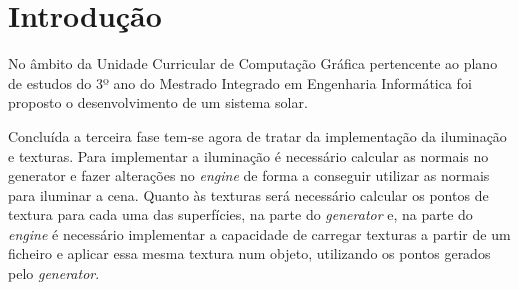 \chapter{Introdução}
\label{cap:intro}

No âmbito da Unidade Curricular de Computação Gráfica pertencente ao plano de estudos do 3º ano do Mestrado Integrado em Engenharia Informática foi proposto o desenvolvimento de um sistema solar. 

Concluída a terceira fase tem-se agora de tratar da implementação da iluminação e texturas. Para implementar a iluminação  é necessário calcular as normais no generator e fazer alterações no  \textit{engine} de forma a conseguir utilizar as normais para iluminar a cena.
Quanto às texturas será necessário calcular os pontos de textura para cada uma das superfícies, na parte do \textit{generator} e, na parte do \textit{engine} é necessário
implementar a capacidade de carregar texturas a partir de um ficheiro e aplicar essa mesma textura num objeto, utilizando os pontos gerados pelo \textit{generator}.


